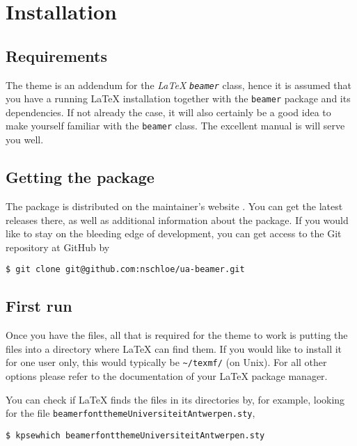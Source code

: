 \section{Installation}

\subsection{Requirements}
The theme is an addendum for the \emph{\LaTeX} \emph{\texttt{beamer}} class, hence it is assumed that you have a running \LaTeX{} installation together with the \texttt{beamer} package \cite{Miletic:2010:LBC} and its dependencies. If not already the case, it will also certainly be a good idea to make yourself familiar with the \texttt{beamer} class. The excellent manual \cite{TWM:2010:BCU} is will serve you well.

\subsection{Getting the package}

The package is distributed on the maintainer's website \cite{Schloemer:2011:website}. You can get the latest releases there, as well as additional information about the package. If you would like to stay on the bleeding edge of development, you can get access to the Git  repository at GitHub \cite{GitHub:2011:uabeamer} by
\begin{lstlisting}
$ git clone git@github.com:nschloe/ua-beamer.git
\end{lstlisting}


\subsection{First run}
Once you have the files, all that is required for the theme to work is putting the files into a directory where \LaTeX{} can find them. If you would like to install it for one user only, this would typically be \lstinline{~/texmf/} (on Unix). For all other options please refer to the documentation of your \LaTeX{} package manager.

You can check if \LaTeX{} finds the files in its directories by, for example, looking for the file \lstinline!beamerfontthemeUniversiteitAntwerpen.sty!,
\begin{lstlisting}
$ kpsewhich beamerfontthemeUniversiteitAntwerpen.sty
\end{lstlisting}

